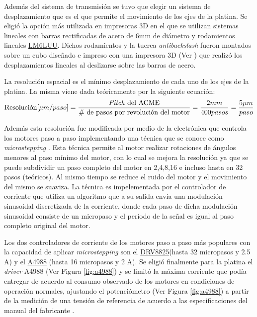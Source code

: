 Además del sistema de transmisión se tuvo que elegir un sistema de desplazamiento que es el que permite el movimiento de los ejes de la platina. Se eligió la opción más utilizada en impresoras 3D en el que se utilizan sistemas lineales con barras rectificadas de acero de 6mm de diámetro y rodamientos lineales \href{https://uk.misumi-ec.com/vona2/detail/221000091678/?HissuCode=LM6LUU}{LM6LUU}. Dichos rodamientos y la tuerca \textit{antibackslash} fueron montados sobre un cubo diseñado e impreso con una impresora 3D (Ver \href{https://github.com/jrr1984/open_frame_XYStage/blob/master/3dprintedparts/STLs/cuboconLM6UU_2demarzo.STL}{\faCubes}) que realizó los desplazamientos lineales al deslizarse sobre las barras de acero.

La resolución espacial es el mínimo desplazamiento de cada uno de los ejes de la platina. La misma viene dada teóricamente por la siguiente ecuación:
\begin{equation}
\text{Resolución} [\mu m / paso] = \frac{\text{\textit{Pitch} del ACME}}{\text{\# de pasos por revolución del motor}} = \frac{2 mm}{400 pasos} = \frac{5 \mu m}{paso}
\end{equation}

Además esta resolución fue modificada por medio de la electrónica que controla los motores paso a paso implementando una técnica que se conoce como \textit{microstepping} \cite{7806244}. Esta técnica permite al motor realizar rotaciones de ángulos menores al paso mínimo del motor, con lo cual se mejora la resolución ya que se puede subdividir un paso completo del motor en 2,4,8,16 e incluso hasta en 32 pasos (teóricos). Al mismo tiempo se reduce el ruido del motor y el movimiento del mismo se suaviza. La técnica es impelementada por el controlador de corriente que utiliza un algoritmo que a su salida envía una modulación sinusoidal discretizada de la corriente, donde cada paso de dicha modulación sinusoidal consiste de un micropaso y el período de la señal es igual al paso completo original del motor.

Los dos controladores de corriente de los motores paso a paso más populares con la capacidad de aplicar \textit{microstepping} son el \href{https://www.pololu.com/product/2133}{DRV8825}(hasta 32 micropasos y 2.5 A) y el \href{https://www.pololu.com/product/1182}{A4988} (hasta 16 micropasos y 2 A). Se eligió finalmente para la platina el \textit{driver} A4988 (Ver Figura \ref{fig:a4988}) y se limitó la máxima corriente que podía entregar de acuerdo al consumo observado de los motores en condiciones de operación normales, ajustando el potenciómetro (Ver Figura \ref{fig:a4988}) a partir de la medición de una tensión de referencia de acuerdo a las especificaciones del manual del fabricante \cite{a4988}.

